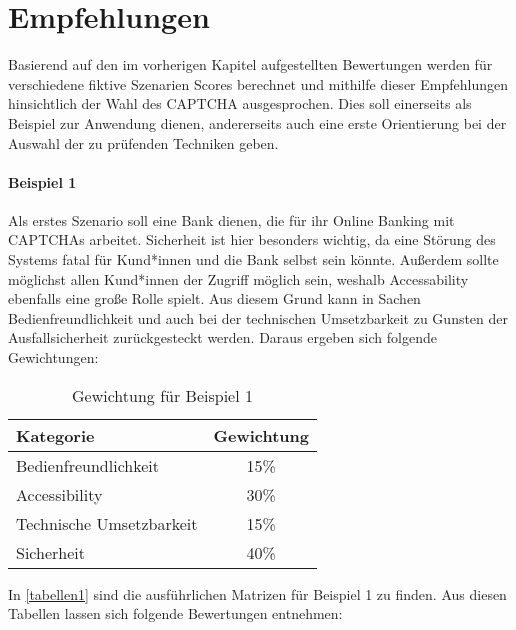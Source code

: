 \chapter{Empfehlungen}
\label{ch:empfehlung}

Basierend auf den im vorherigen Kapitel aufgestellten Bewertungen werden für verschiedene fiktive Szenarien Scores berechnet 
und mithilfe dieser Empfehlungen hinsichtlich der Wahl des CAPTCHA ausgesprochen. 
Dies soll einerseits als Beispiel zur Anwendung dienen, 
andererseits auch eine erste Orientierung bei der Auswahl der zu prüfenden Techniken geben. 

\subsubsection*{Beispiel 1}
Als erstes Szenario soll eine Bank dienen, die für ihr Online Banking mit CAPTCHAs arbeitet.
Sicherheit ist hier besonders wichtig, 
da eine Störung des Systems fatal für Kund*innen und die Bank selbst sein könnte.
Außerdem sollte möglichst allen Kund*innen der Zugriff möglich sein, 
weshalb Accessability ebenfalls eine große Rolle spielt.
Aus diesem Grund kann in Sachen Bedienfreundlichkeit 
und auch bei der technischen Umsetzbarkeit zu Gunsten der Ausfallsicherheit zurückgesteckt werden.
Daraus ergeben sich folgende Gewichtungen:

\begin{table}[h!]
    \caption{Gewichtung für Beispiel 1}
    \begin{center}
        \begin{tabular}{l|c}
            Kategorie                       & Gewichtung \\\hline
            Bedienfreundlichkeit            & 15\%         \\
            Accessibility                   & 30\%        \\
            Technische Umsetzbarkeit        & 15\%         \\
            Sicherheit                      & 40\%         
        \end{tabular}
    \end{center}
\end{table}

In \autoref{tabellen1} sind die ausführlichen Matrizen für Beispiel 1 zu finden. 
Aus diesen Tabellen lassen sich folgende Bewertungen entnehmen: 

